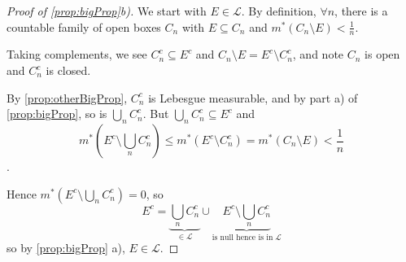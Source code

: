 \documentclass{article}
\newcommand{\1}[1]{\mathbbm{1}_{#1}}
\begin{document}
\begin{proof}[Proof of \cref{prop:bigProp}b)]
    We start with $E \in \mathcal{L}$.  By definition, $\forall n$, there is a countable family of open boxes $C_n$ with $E \subseteq C_n$ and $m^* (C_n \setminus E) < \frac1n$.

    Taking complements, we see $C_n^c \subseteq E^c$ and $C_n \setminus E = E^c \setminus C_n^c$, and note $C_n$ is open and $C_n^c$ is closed.

    By \cref{prop:otherBigProp}, $C_n^c$ is Lebesgue measurable, and by part a) of \cref{prop:bigProp}, so is $\bigcup_n C_n^c$. But $\bigcup_n C_n^c \subseteq E^c$ and \begin{equation*}m^*\left(E^c \setminus \bigcup_n C_n^c\right) \leq m^*(E^c \setminus C_n^c) = m^* (C_n \setminus E) < \frac1n\end{equation*}.

    Hence $m^* (E^c \setminus \bigcup_n C_n^c) = 0$, so
    \begin{equation*}
        E^c = \underbrace{\bigcup_n C_n^c}_{\in \mathcal{L}} \cup \underbrace{E^c \setminus \bigcup_n C_n^c}_{\text{is null hence is in} \; \mathcal{L}}
    \end{equation*}
    so by \cref{prop:bigProp} a), $E \in \mathcal{L}$.
\end{proof}
\end{document}

